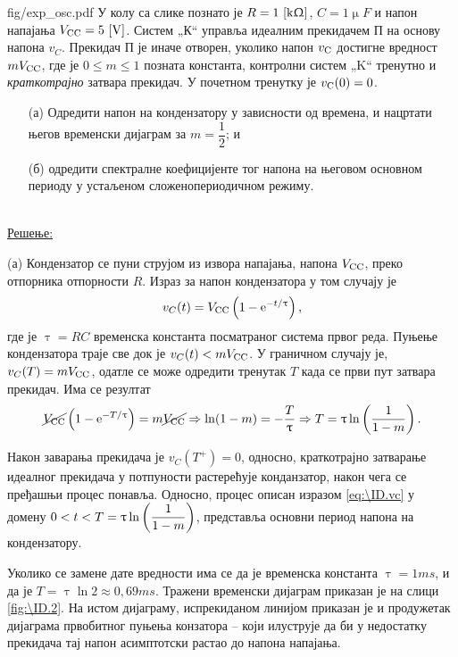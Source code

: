 \begin{slikaDesno}{fig/exp_osc.pdf}
\PID У колу са слике познато је 
$R = 1\,\left[\mathrm{k\Upomega}\right]$, $C=1\unit{\upmu F}$ и 
напон напајања $V_{\rm CC} = 5\,\left[\mathrm{V}\right]$.
Систем „К“ управља идеалним прекидачем П 
на основу напона $v_{C}$. Прекидач П је иначе 
отворен, уколико напон $v_{\rm C}$ достигне вредност 
$mV_{\rm CC}$, где је $0 \leq m \leq 1$ позната 
константа, контролни систем „K“ тренутно и 
\textit{краткотрајно} затвара прекидач. У почетном 
тренутку је $v_{\rm C}(0) = 0$. 
\begin{enumerate}
\item[(а)] Одредити  напон 
на кондензатору у зависности од времена, и нацртати његов временски 
дијаграм за $m = \dfrac{1}{2}$; и
\item[(б)] одредити спектралне коефицијенте 
тог напона на његовом основном периоду у устаљеном 
сложенопериодичном режиму. 
\end{enumerate}
\end{slikaDesno} \\


\underline{\sc Решење:} 

(а) Кондензатор се пуни струјом из извора напајања, напона $V_{\rm CC}$,  
преко отпорника отпорности $R$. Израз за напон кондензатора у том случају је 
\begin{equation}
v_{C}(t) = V_{\rm CC} \left(
    1 - \ee^{-t/\uptau} 
\right), \label{eq:\ID.vc}
\end{equation} где је $\uptau = RC$ временска константа посматраног система првог реда. Пуњење кондензатора траје
све док је $v_C(t) < m V_{\rm CC}$. У граничном случају је, 
$v_C(T) = m V_{\rm CC}$, одатле се може одредити тренутак $T$ када се први пут затвара прекидач. 
Има се резултат
\begin{equation}
    \cancel {V_{\rm CC}} \left(
    1 - {\rm e}^{-T/\uptau} \right) = m \cancel{V_{\rm CC}}
    \Rightarrow \ln(1 - m) = -\dfrac{T}{\uptau} \Rightarrow 
    T = \uptau \ln \left( \dfrac{1}{1 - m} \right).
\end{equation}

Након заварања прекидача је $v_{C}(T^+) = 0$, односно, краткотрајно затварање идеалног прекидача 
у потпуности растерећује конданзатор, након чега се пређашњи процес понавља. 
Односно, процес описан изразом \eqref{eq:\ID.vc} у домену 
$\displaystyle 0 < t < T = \uptau \ln \left( \dfrac{1}{1 - m} \right)$, представља основни период напона
на кондензатору. 

Уколико се замене дате вредности има се да је временска константа 
$\uptau = 1\unit{ms}$, и да је $T = \uptau \ln 2 \approx 0,69 \unit{ms}$. 
Тражени временски дијаграм приказан је на слици \ref{fig:\ID.2}. На истом дијаграму, испрекиданом
линијом приказан је и продужетак дијаграма првобитног пуњења конзатора -- који илуструје да би 
у недостатку прекидача тај напон асимптотски растао до напона напајања. 


